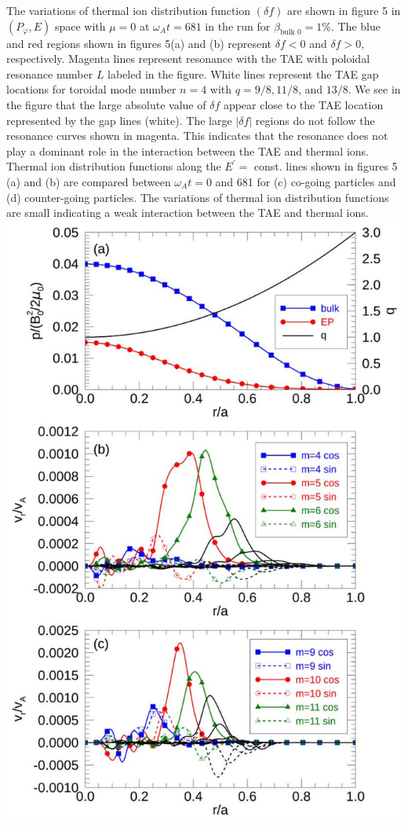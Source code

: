 \documentclass[10pt]{article}
\begin{document}
The variations of thermal ion distribution function $(\delta f)$ are shown in figure 5 in $\left(P_{\varphi}, E\right)$ space with $\mu=0$ at $\omega_{A} t=681$ in the run for $\beta_{\text {bulk } 0}=1 \%$. The blue and red regions shown in figures 5(a) and (b) represent $\delta f<0$ and $\delta f>0$, respectively. Magenta lines represent resonance with the TAE with poloidal resonance number $L$ labeled in the figure. White lines represent the TAE gap locations for toroidal mode number $n=4$ with $q=9 / 8,11 / 8$, and $13 / 8$. We see in the figure that the large absolute value of $\delta f$ appear close to the TAE location represented by the gap lines (white). The large $|\delta f|$ regions do not follow the resonance curves shown in magenta. This indicates that the resonance does not play a dominant role in the interaction between the TAE and thermal ions. Thermal ion distribution functions along the $E^{\prime}=$ const. lines shown in figures 5 (a) and (b) are compared between $\omega_{A} t=0$ and 681 for (c) co-going particles and (d) counter-going particles. The variations of thermal ion distribution functions are small indicating a weak interaction between the TAE and thermal ions.
\includegraphics[max width=\textwidth, center]{2023_06_04_de2f4b8aa3fd859f006dg-09}
\end{document}
